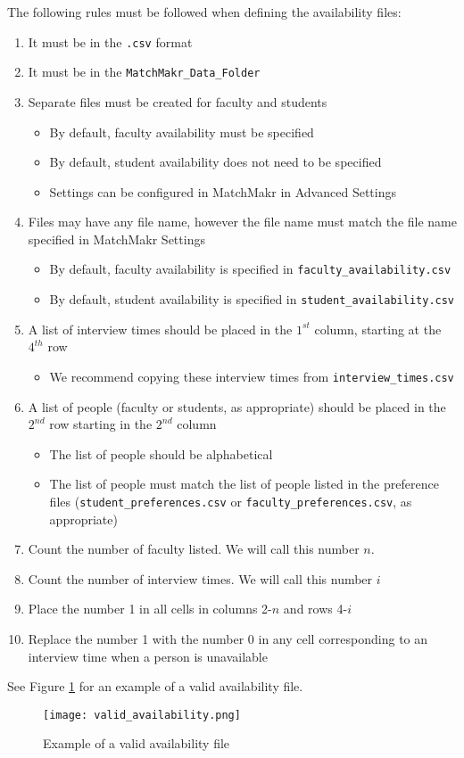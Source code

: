 The following rules must be followed when defining the availability files:
\begin{enumerate}
	\item It must be in the \texttt{.csv} format
	\item It must be in the \texttt{MatchMakr\_Data\_Folder}
	\item Separate files must be created for faculty and students
		\begin{itemize}
			\item By default, faculty availability must be specified
			\item By default, student availability does not need to be specified
			\item Settings can be configured in MatchMakr in Advanced Settings 
		\end{itemize}
	\item Files may have any file name, however the file name must match the file name specified in MatchMakr Settings
		\begin{itemize}
			\item By default, faculty availability is specified in \texttt{faculty\_availability.csv}
			\item By default, student availability is specified in \texttt{student\_availability.csv}
		\end{itemize}
	\item A list of interview times should be placed in the $1^{st}$ column, starting at the $4^{th}$ row
		\begin{itemize}
			\item We recommend copying these interview times from \texttt{interview\_times.csv} 
		\end{itemize}
	\item A list of people (faculty or students, as appropriate) should be placed in the $2^{nd}$ row starting in the $2^{nd}$ column
		\begin{itemize}
			\item The list of people should be alphabetical
			\item The list of people must match the list of people listed in the preference files (\texttt{student\_preferences.csv} or \texttt{faculty\_preferences.csv}, as appropriate)
		\end{itemize}
	\item Count the number of faculty listed.  We will call this number $n$.
	\item Count the number of interview times.  We will call this number $i$
	\item Place the number 1 in all cells in columns 2-$n$ and rows 4-$i$
	\item Replace the number 1 with the number 0 in any cell corresponding to an interview time when a person is unavailable
\end{enumerate}

See Figure \ref{fig:valid_availability} for an example of a valid availability file.

\begin{figure}
	\centering
	\texttt{[image: valid\_availability.png]}
	\caption{\label{fig:valid_availability} Example of a valid availability file}
\end{figure}

